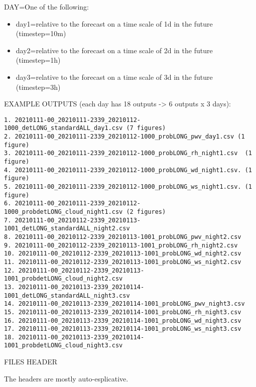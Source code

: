 \documentclass[11pt,english]{article}
\begin{document}
DAY=One of the following:
\begin{itemize}
\item day1=relative to the forecast on a time scale of 1d in the future (timestep=10m)
\item day2=relative to the forecast on a time scale of 2d in the future (timestep=1h)
\item day3=relative to the forecast on a time scale of 3d in the future (timestep=3h)
\end{itemize}


EXAMPLE OUTPUTS (each day has 18 outputs -> 6 outputs x 3 days):
\begin{verbatim}
1. 20210111-00_20210111-2339_20210112-1000_detLONG_standardALL_day1.csv (7 figures)
2. 20210111-00_20210111-2339_20210112-1000_probLONG_pwv_day1.csv (1 figure)
3. 20210111-00_20210111-2339_20210112-1000_probLONG_rh_night1.csv  (1 figure)
4. 20210111-00_20210111-2339_20210112-1000_probLONG_wd_night1.csv. (1 figure)
5. 20210111-00_20210111-2339_20210112-1000_probLONG_ws_night1.csv. (1 figure)
6. 20210111-00_20210111-2339_20210112-1000_probdetLONG_cloud_night1.csv (2 figures)
7. 20210111-00_20210112-2339_20210113-1001_detLONG_standardALL_night2.csv
8. 20210111-00_20210112-2339_20210113-1001_probLONG_pwv_night2.csv
9. 20210111-00_20210112-2339_20210113-1001_probLONG_rh_night2.csv
10. 20210111-00_20210112-2339_20210113-1001_probLONG_wd_night2.csv
11. 20210111-00_20210112-2339_20210113-1001_probLONG_ws_night2.csv
12. 20210111-00_20210112-2339_20210113-1001_probdetLONG_cloud_night2.csv
13. 20210111-00_20210113-2339_20210114-1001_detLONG_standardALL_night3.csv
14. 20210111-00_20210113-2339_20210114-1001_probLONG_pwv_night3.csv
15. 20210111-00_20210113-2339_20210114-1001_probLONG_rh_night3.csv
16. 20210111-00_20210113-2339_20210114-1001_probLONG_wd_night3.csv
17. 20210111-00_20210113-2339_20210114-1001_probLONG_ws_night3.csv
18. 20210111-00_20210113-2339_20210114-1001_probdetLONG_cloud_night3.csv
\end{verbatim}

FILES HEADER

The headers are mostly auto-esplicative.
\end{document}
